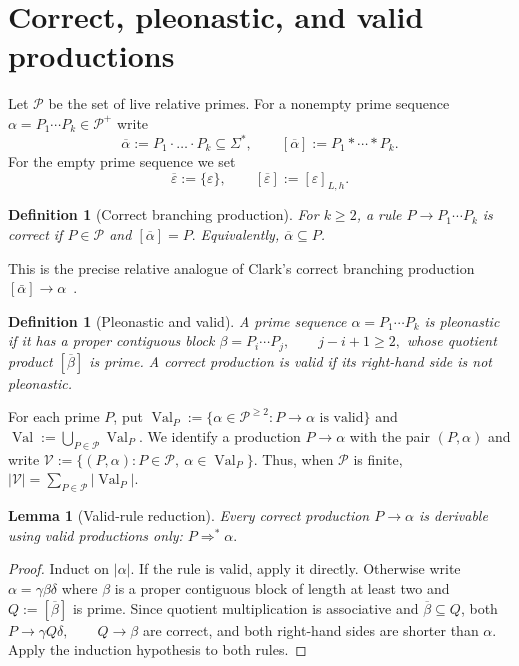 \documentclass[11pt,a4paper]{article}
\newtheorem{lemma}[theorem]{Lemma}
\newtheorem{definition}[theorem]{Definition}
\newcommand{\eps}{\varepsilon}
\newcommand{\Pcal}{\mathcal P}
\newcommand{\Vcal}{\mathcal V}
\newcommand{\Val}{\operatorname{Val}}
\begin{document}
\section{Correct, pleonastic, and valid productions}
\label{sec:valid}

Let $\Pcal$ be the set of live relative primes.  For a nonempty prime sequence
\(\alpha=P_1\cdots P_k\in\Pcal^+\)
write
\[
  \overline\alpha:=P_1\cdot\ldots\cdot P_k\subseteq\Sigma^*,
  \qquad
  [\overline\alpha]:=P_1*\cdots*P_k.
\]
For the empty prime sequence we set
\[
  \overline\eps:=\{\eps\},
  \qquad
  [\overline\eps]:=[\eps]_{L,h}.
\]

\begin{definition}[Correct branching production]
For $k\ge2$, a rule
\(P\to P_1\cdots P_k\)
is \emph{correct} if $P\in\Pcal$ and
\([\overline\alpha]=P.\)
Equivalently, $\overline\alpha\subseteq P$.
\end{definition}

This is the precise relative analogue of Clark's correct branching production $[\bar\alpha]\to\alpha$~\cite{Clark2013Trees}.

\begin{definition}[Pleonastic and valid]
A prime sequence $\alpha=P_1\cdots P_k$ is \emph{pleonastic} if it has a proper contiguous block
\(\beta=P_i\cdots P_j, \qquad j-i+1\ge2,\)
whose quotient product $[\overline\beta]$ is prime.  A correct production is \emph{valid} if its right-hand side is not pleonastic.
\end{definition}

For each prime $P$, put
\(\Val_P:=\{\alpha\in\Pcal^{\ge2}:P\to\alpha\text{ is valid}\}\)
and \(\Val:=\bigcup_{P\in\Pcal}\Val_P.\)
We identify a production $P\to\alpha$ with the pair $(P,\alpha)$ and write
\(\Vcal:=\{(P,\alpha):P\in\Pcal,\ \alpha\in\Val_P\}.\)
Thus, when $\Pcal$ is finite, $|\Vcal|=\sum_{P\in\Pcal}|\Val_P|$.

\begin{lemma}[Valid-rule reduction]
Every correct production
\(P\to\alpha\)
is derivable using valid productions only:
\(P\Rightarrow^*\alpha.\)
\end{lemma}

\begin{proof}
Induct on $|\alpha|$.  If the rule is valid, apply it directly.  Otherwise write
\(\alpha=\gamma\beta\delta\)
where $\beta$ is a proper contiguous block of length at least two and
\(Q:=[\overline\beta]\)
is prime.  Since quotient multiplication is associative and $\overline\beta\subseteq Q$, both
\(P\to\gamma Q\delta, \qquad Q\to\beta\)
are correct, and both right-hand sides are shorter than $\alpha$.  Apply the induction hypothesis to both rules.
\end{proof}
\end{document}
